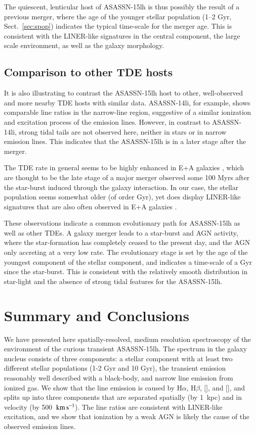 \documentclass[traditabstract]{aa}
\newcommand{\kms}{$\rm{km\,s^{-1}}$}
\newcommand{\hb}{H$\beta$}
\newcommand{\ha}{H$\alpha$}
\newcommand{\oiii}{[\ion{O}{iii}]}
\newcommand{\nii}{[\ion{N}{ii}]}
\begin{document}
The quiescent, lenticular host of ASASSN-15lh is thus possibly the result of a previous merger, where the age of the younger stellar population (1--2 Gyr, Sect.~\ref{sec:spop}) indicates the typical time-scale for the merger age. This is consistent with the LINER-like signatures in the central component, the large scale environment, as well as the galaxy morphology.

\subsection{Comparison to other TDE hosts}

It is also illustrating to contrast the ASASSN-15lh host to other, well-observed and more nearby TDE hosts with similar data. ASASSN-14li, for example, shows comparable line ratios in the narrow-line region, suggestive of a similar ionization and excitation process of the emission lines. However, in contrast to ASASSN-14li, strong tidal tails are not observed here, neither in stars or in narrow emission lines. This indicates that the ASASSN-15lh is in a later stage after the merger.

The TDE rate in general seems to be highly enhanced in E+A galaxies \citep{2014ApJ...793...38A, 2016ApJ...818L..21F}, which are thought to be the late stage of a major merger observed some 100 Myrs after the star-burst induced through the galaxy interaction. In our case, the stellar population seems somewhat older (of order Gyr), yet does display LINER-like signatures that are also often observed in E+A galaxies \citep{2006ApJ...646L..33Y}.

These observations indicate a common evolutionary path for ASASSN-15lh as well as other TDEs. A galaxy merger leads to a star-burst and AGN activity, where the star-formation has completely ceased to the present day, and the AGN only accreting at a very low rate. The evolutionary stage is set by the age of the youngest component of the stellar component, and indicates a time-scale of a Gyr since the star-burst. This is consistent with the relatively smooth distribution in star-light and the absence of strong tidal features for the ASASSN-15lh.

\section{Summary and Conclusions}

We have presented here spatially-resolved, medium resolution spectroscopy of the environment of the curious transient ASASSN-15lh. The spectrum in the galaxy nucleus consists of three components: a stellar component with at least two different stellar populations (1-2 Gyr and 10 Gyr), the transient emission reasonably well described with a black-body, and narrow line emission from ionized gas. We show that the line emission is caused by \ha, \hb, \nii, and \oiii, and splits up into three components that are separated spatially (by 1~kpc) and in velocity (by 500~\kms). The line ratios are consistent with LINER-like excitation, and we show that ionization by a weak AGN is likely the cause of the observed emission lines.
\end{document}
